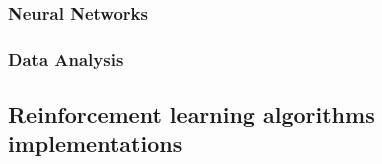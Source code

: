 \subsubsection{Neural Networks}

\subsubsection{Data Analysis}

\subsection{Reinforcement learning algorithms implementations}




